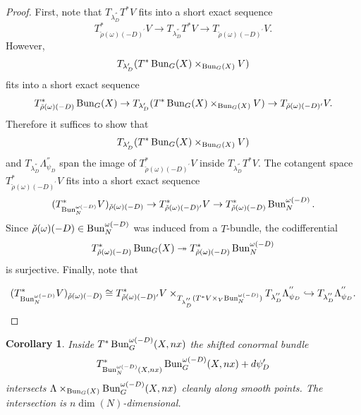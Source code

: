 \documentclass[9pt]{amsart}
\newtheorem{cor}[subsubsection]{Corollary}
\numberwithin{equation}{section}
\begin{document}
\begin{proof}
	First, note that $T_{\lambda_D^{''}} T^*V$ fits into a short exact sequence
	\begin{equation}
		T^*_{\check{\rho}(\omega)(-D)^{\prime}} V \rightarrow T_{\lambda_D^{''}} T^*V \rightarrow T_{\check{\rho}(\omega)(-D)^{\prime}} V.
	\end{equation}
	However, $$T_{\lambda_D^{\prime}} (T^*\operatorname{{Bun}}_G(X) \times_{\operatorname{{Bun}}_G(X)} V)$$
	fits into a short exact sequence
	\begin{equation}
		T^*_{\check{\rho}(\omega)(-D)} \operatorname{{Bun}}_G(X) \rightarrow T_{\lambda_D^{\prime}} (T^*\operatorname{{Bun}}_G(X) \times_{\operatorname{{Bun}}_G(X)} V)\rightarrow T_{\check{\rho}(\omega)(-D)^{\prime}} V.
	\end{equation}
	Therefore it suffices to show that $$T_{\lambda_D^{\prime}} (T^*\operatorname{{Bun}}_G(X) \times_{\operatorname{{Bun}}_G(X)} V)$$ and $T_{\lambda_D^{''}}\Lambda^{''}_{\psi_D}$ span the image of $T^*_{\check{\rho}(\omega)(-D)^{\prime}} V$ inside $T_{\lambda_D^{''}} T^*V$. 
	The cotangent space $T^*_{\check{\rho}(\omega)(-D)^{\prime}} V$ fits into a short exact sequence
	\begin{equation}
		(T^*_{\operatorname{{Bun}}_{N}^{\omega(-D)}} V)_{\check{\rho}(\omega)(-D)}\rightarrow T^*_{\check{\rho}(\omega)(-D)^{\prime}} V\rightarrow T^*_{\check{\rho}(\omega)(-D)} \operatorname{{Bun}}_{N}^{\omega(-D)}.
	\end{equation}
	Since $\check{\rho}(\omega)(-D) \in \operatorname{{Bun}}_{N}^{\omega(-D)}$ was induced from a $T$-bundle, the codifferential 
	$$T^*_{\check{\rho}(\omega)(-D)} \operatorname{{Bun}}_G(X) \twoheadrightarrow T^*_{\check{\rho}(\omega)(-D)} \operatorname{{Bun}}_{N}^{\omega(-D)}$$ is surjective. Finally, note that 
	
	\begin{equation}
	(T^*_{\operatorname{{Bun}}_{N}^{\omega(-D)}} V)_{\check{\rho}(\omega)(-D)}
	\cong  T^*_{\check{\rho}(\omega)(-D)^{\prime}} V\times_{T_{\lambda_D^{''}} (T^*V\times_{V}  \operatorname{{Bun}}_{N}^{\omega(-D)})} T_{\lambda_D^{''}}\Lambda^{''}_{\psi_D} \hookrightarrow  T_{\lambda_D^{''}}\Lambda^{''}_{\psi_D} .
	\end{equation}
\end{proof}






\begin{cor}\label{clean intersection}
	Inside $T^*\operatorname{{Bun}}_{G}^{\omega(-D)}(X, nx)$ the shifted conormal bundle
	$$T^*_{\operatorname{{Bun}}_{N}^{\omega(-D)}(X, nx)}\operatorname{{Bun}}_{G}^{\omega(-D)}(X, nx)+ d\psi_D^{\prime}$$
	intersects $\Lambda \times_{\operatorname{{Bun}}_{G}(X)} \operatorname{{Bun}}_G^{\omega(-D)}(X, nx)$ cleanly along smooth points. The intersection is $n \dim(N)$-dimensional.
\end{cor}
\end{document}
